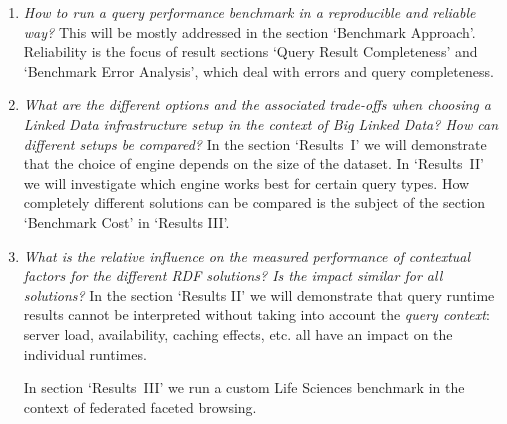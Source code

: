 \begin{enumerate}
\item \textit{How to run a query performance benchmark in a reproducible and reliable way?}
This will be mostly addressed in the section `Benchmark Approach'. Reliability is the focus of result sections `Query Result Completeness' and `Benchmark Error Analysis', 
which deal with errors and query completeness. 

\item \textit{What are the different options and the associated trade-offs when choosing a Linked Data infrastructure setup in the context of Big Linked Data? How can different setups be compared? }
In the section `Results~I' we will demonstrate that the choice of engine depends on the size of the dataset. In `Results~II' we will investigate which engine works best for certain query types. How completely different solutions can be compared is the subject of the section `Benchmark Cost' in `Results III'.

\item \textit{What is the relative influence on the measured performance of contextual factors for the different RDF solutions? Is the impact similar for all solutions?}
In the section `Results II' we will demonstrate that query runtime results cannot be interpreted without taking into account the \emph{query context}: server load, availability, caching effects, etc. all have an impact on the individual runtimes.

In section `Results~III' we run a custom Life Sciences benchmark in the context of federated faceted browsing. 

\end{enumerate}